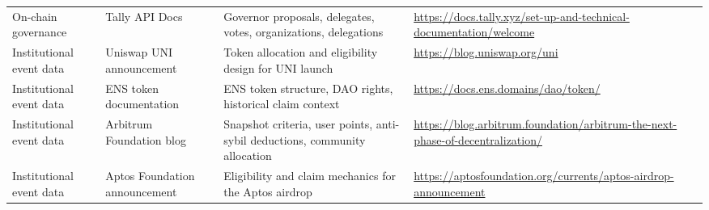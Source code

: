 \documentclass[11pt]{article}
\theoremstyle{remark}
\begin{document}
\begin{longtable}{p{}p{}p{}p{}}
On-chain governance & Tally API Docs & Governor proposals, delegates, votes, organizations, delegations & \url{https://docs.tally.xyz/set-up-and-technical-documentation/welcome} \\
Institutional event data & Uniswap UNI announcement & Token allocation and eligibility design for UNI launch & \url{https://blog.uniswap.org/uni} \\
Institutional event data & ENS token documentation & ENS token structure, DAO rights, historical claim context & \url{https://docs.ens.domains/dao/token/} \\
Institutional event data & Arbitrum Foundation blog & Snapshot criteria, user points, anti-sybil deductions, community allocation & \url{https://blog.arbitrum.foundation/arbitrum-the-next-phase-of-decentralization/} \\
Institutional event data & Aptos Foundation announcement & Eligibility and claim mechanics for the Aptos airdrop & \url{https://aptosfoundation.org/currents/aptos-airdrop-announcement} \\
\bottomrule
\end{longtable}



\end{document}
